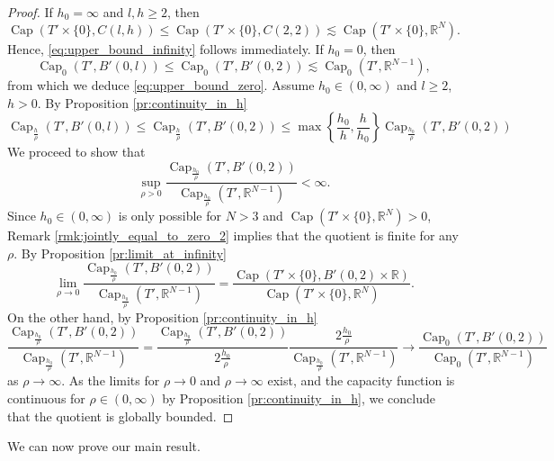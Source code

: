 \documentclass{article}
\numberwithin{equation}{section}
\theoremstyle{definition}
\theoremstyle{remark}
\newcommand{\cpct}{\operatorname{Cap}}
\begin{document}
\begin{proof}
    If $h_0 = \infty$ and $l, h \ge 2$, then
    \[
    \cpct(T' \times \{0\}, C(l, h)) \le \cpct(T' \times \{0\}, C(2, 2)) \lesssim \cpct(T' \times \{0\}, \mathbb{R}^N).
    \]
    Hence, \eqref{eq:upper_bound_infinity} follows immediately. If $h_0 = 0$, then
    \[
    \cpct_0(T', B'(0, l)) \le \cpct_0(T', B'(0, 2)) \lesssim \cpct_0(T', \mathbb{R}^{N - 1}),
    \]
    from which we deduce \eqref{eq:upper_bound_zero}. Assume $h_0 \in (0, \infty)$ and $l \ge 2$, $h > 0$. By Proposition \ref{pr:continuity_in_h}
    \[
    \cpct_\frac{h}{\rho}(T', B'(0, l)) \le \cpct_\frac{h}{\rho}(T', B'(0, 2)) \le \max \left\{\frac{h_0}{h}, \frac{h}{h_0}\right\} \cpct_\frac{h_0}{\rho}(T', B'(0, 2))
    \]
    We proceed to show that
    \[
    \sup_{\rho > 0} \frac{\cpct_\frac{h_0}{\rho}(T', B'(0, 2))}{\cpct_\frac{h_0}{\rho}(T', \mathbb{R}^{N - 1})} < \infty.
    \]
    Since $h_0 \in (0, \infty)$ is only possible for $N > 3$ and $\cpct(T' \times \{0\}, \mathbb{R}^N) > 0$, Remark \ref{rmk:jointly_equal_to_zero_2} implies that the quotient is finite for any $\rho$. By Proposition \ref{pr:limit_at_infinity}
    \[
    \lim_{\rho \to 0} \frac{\cpct_\frac{h_0}{\rho}(T', B'(0, 2))}{\cpct_\frac{h_0}{\rho}(T', \mathbb{R}^{N - 1})} = \frac{\cpct(T' \times \{0\}, B'(0, 2) \times \mathbb{R})}{\cpct(T' \times \{0\}, \mathbb{R}^N)}.
    \]
    On the other hand, by Proposition \ref{pr:continuity_in_h}
    \[
    \frac{\cpct_\frac{h_0}{\rho}(T', B'(0, 2))}{\cpct_\frac{h_0}{\rho}(T', \mathbb{R}^{N - 1})} = \frac{\cpct_\frac{h_0}{\rho}(T', B'(0, 2))}{2\frac{h_0}{\rho}} \frac{2\frac{h_0}{\rho}}{\cpct_\frac{h_0}{\rho}(T', \mathbb{R}^{N - 1})} \to \frac{\cpct_0(T', B'(0, 2))}{\cpct_0(T', \mathbb{R}^{N - 1})}
    \]
    as $\rho \to \infty$. As the limits for $\rho \to 0$ and $\rho \to \infty$ exist, and the capacity function is continuous for $\rho \in (0, \infty)$ by Proposition \ref{pr:continuity_in_h}, we conclude that the quotient is globally bounded.
\end{proof}

We can now prove our main result.
\end{document}
